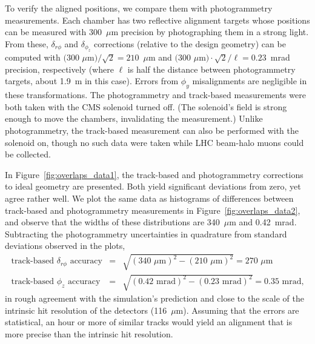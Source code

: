 To verify the aligned positions, we compare them with photogrammetry
measurements.  Each chamber has two reflective alignment targets whose
positions can be measured with 300~$\mu$m precision by photographing
them in a strong light.  From these, $\delta_{r\phi}$ and
$\delta_{\phi_z}$ corrections (relative to the design geometry) can be
computed with $\mbox{(300~$\mu$m)}/\sqrt{2} = 210$~$\mu$m and
$\mbox{(300~$\mu$m)} \cdot \sqrt{2} / \ell = 0.23$~mrad precision,
respectively (where $\ell$ is half the distance between photogrammetry
targets, about 1.9~m in this case).  Errors from $\phi_y$
misalignments are negligible in these transformations.  The
photogrammetry and track-based measurements were both taken with the
CMS solenoid turned off.  (The solenoid's field is strong enough to
move the chambers, invalidating the measurement.)  Unlike
photogrammetry, the track-based measurement can also be performed with
the solenoid on, though no such data were taken while LHC beam-halo muons
could be collected.

In Figure~\ref{fig:overlaps_data1}, the track-based and photogrammetry
corrections to ideal geometry are presented.  Both yield significant
deviations from zero, yet agree rather well.  We plot the same
data as histograms of differences between track-based and
photogrammetry measurements in Figure~\ref{fig:overlaps_data2}, and
observe that the widths of these distributions are 340~$\mu$m and
0.42~mrad.  Subtracting the
photogrammetry uncertainties in quadrature from standard deviations
observed in the plots,
\begin{eqnarray}
\mbox{track-based $\delta_{r\phi}$ accuracy} &=& \sqrt{(\mbox{340~$\mu$m})^2 - (\mbox{210~$\mu$m})^2} = \mbox{270~$\mu$m} \\
\mbox{track-based $\phi_z$ accuracy} &=& \sqrt{(\mbox{0.42~mrad})^2 - (\mbox{0.23~mrad})^2} = \mbox{0.35~mrad,}
\end{eqnarray}
in rough agreement with the simulation's prediction and close to the
scale of the intrinsic hit resolution of the detectors (116~$\mu$m).  Assuming that
the errors are statistical, an hour or more of similar tracks would
yield an alignment that is more precise than the intrinsic hit resolution.

